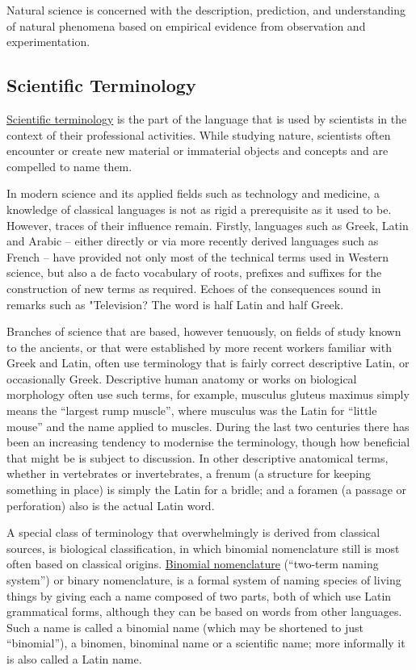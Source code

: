 Natural science is concerned with the description, prediction, and understanding of natural phenomena based on empirical evidence from observation and experimentation.

\hypertarget{scientific-terminology}{%
\subsection{Scientific Terminology}\label{scientific-terminology}}

\href{https://en.wikipedia.org/wiki/Scientific_terminology}{Scientific terminology} is the part of the language that is used by scientists in the context of their professional activities. While studying nature, scientists often encounter or create new material or immaterial objects and concepts and are compelled to name them.

In modern science and its applied fields such as technology and medicine, a knowledge of classical languages is not as rigid a prerequisite as it used to be. However, traces of their influence remain. Firstly, languages such as Greek, Latin and Arabic -- either directly or via more recently derived languages such as French -- have provided not only most of the technical terms used in Western science, but also a de facto vocabulary of roots, prefixes and suffixes for the construction of new terms as required. Echoes of the consequences sound in remarks such as "Television? The word is half Latin and half Greek.

Branches of science that are based, however tenuously, on fields of study known to the ancients, or that were established by more recent workers familiar with Greek and Latin, often use terminology that is fairly correct descriptive Latin, or occasionally Greek. Descriptive human anatomy or works on biological morphology often use such terms, for example, musculus gluteus maximus simply means the ``largest rump muscle'', where musculus was the Latin for ``little mouse'' and the name applied to muscles. During the last two centuries there has been an increasing tendency to modernise the terminology, though how beneficial that might be is subject to discussion. In other descriptive anatomical terms, whether in vertebrates or invertebrates, a frenum (a structure for keeping something in place) is simply the Latin for a bridle; and a foramen (a passage or perforation) also is the actual Latin word.

A special class of terminology that overwhelmingly is derived from classical sources, is biological classification, in which binomial nomenclature still is most often based on classical origins. \href{https://en.wikipedia.org/wiki/Binomial_nomenclature}{Binomial nomenclature} (``two-term naming system'') or binary nomenclature, is a formal system of naming species of living things by giving each a name composed of two parts, both of which use Latin grammatical forms, although they can be based on words from other languages. Such a name is called a binomial name (which may be shortened to just ``binomial''), a binomen, binominal name or a scientific name; more informally it is also called a Latin name.

